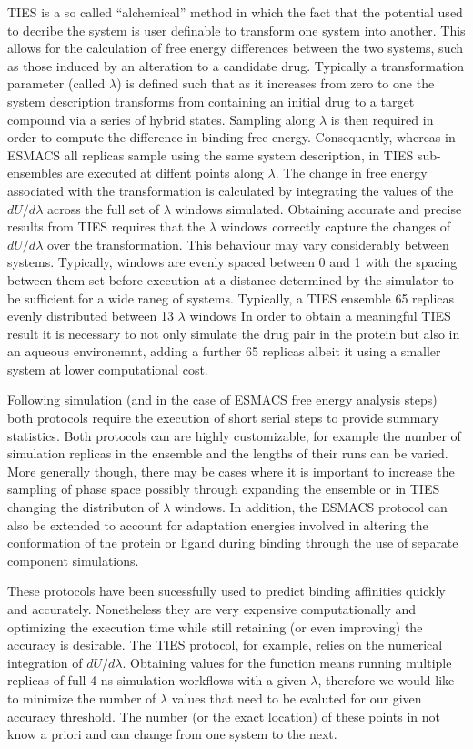 TIES is a so called ``alchemical'' method in which the fact that the potential used to decribe the system is user definable to transform one
system into another.
This allows for the calculation of free energy differences between the two
systems, such as those induced by an alteration to a candidate drug.
Typically a transformation parameter (called $\lambda$) is defined such that as it increases from zero to one the system description transforms from containing an
initial drug to a target compound via a series of hybrid states.
Sampling along $\lambda$ is then required in order to compute the difference in binding free energy.
Consequently, whereas in ESMACS all replicas sample using the same system description,
in TIES sub-ensembles are executed at diffent points along $\lambda$.
The change in free energy associated with the transformation is calculated by integrating the
values of the $dU/d\lambda$ across the full set of $\lambda$ windows simulated.
Obtaining accurate and precise results from TIES requires that the $\lambda$ windows correctly
capture the changes of $dU/d\lambda$ over the transformation.
This behaviour may vary considerably between systems.
Typically, windows are evenly spaced between 0 and 1 with the spacing between them set before
execution at a distance determined by the simulator to be sufficient for a wide raneg of systems.
Typically, a TIES ensemble 65 replicas evenly distributed between 13 $\lambda$ windows
In order to obtain a meaningful TIES result it is necessary to not only simulate the drug pair
in the protein but also in an aqueous environemnt, adding a further 65 replicas albeit it using a
smaller system at lower computational cost.

Following simulation (and in the case of ESMACS free energy analysis steps) both protocols require
the execution of short serial steps to provide summary statistics.
Both protocols can are highly customizable, for example the number of simulation replicas in the
ensemble and the lengths of their runs can be varied.
More generally though, there may be cases where it is important to increase the sampling of phase
space possibly through expanding the ensemble or in TIES changing the distributon of $\lambda$
windows.
In addition, the ESMACS protocol can also be extended to account for adaptation energies involved
in altering the conformation of the protein or ligand during binding through the use of separate
component simulations.

These protocols have been sucessfully used to predict binding affinities quickly and accurately. Nonetheless they are very expensive computationally and optimizing the execution time while still retaining (or even improving) the accuracy is desirable. The TIES protocol, for example, relies on the numerical integration of $dU/d\lambda$. Obtaining values for the function means running multiple replicas of full 4 ns simulation workflows with a given $\lambda$, therefore we would like to minimize the number of $\lambda$ values that need to be evaluted for our given accuracy threshold. The number (or the exact location) of these points in not know a priori and can change from one system to the next.

